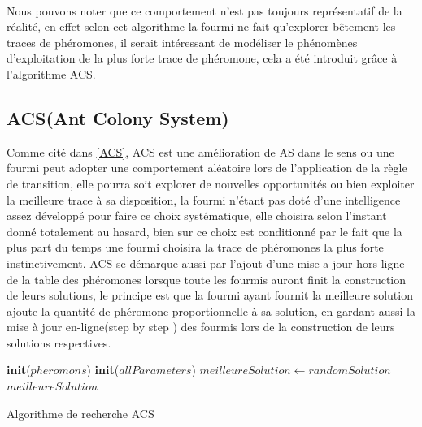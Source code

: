 	\paragraph{}
	Nous pouvons noter que ce comportement n'est pas toujours représentatif de la réalité, en effet selon cet algorithme la fourmi ne fait qu'explorer bêtement les traces de phéromones, il serait intéressant de modéliser le phénomènes d'exploitation de la plus forte trace de phéromone, cela a été introduit grâce à l'algorithme ACS. 
	\newpage
	\subsection{ACS(Ant Colony System)}
	Comme cité dans \ref{ACS}, ACS est une amélioration de AS dans le sens ou une fourmi peut adopter une comportement aléatoire lors de l'application de la règle de transition, elle pourra soit explorer de nouvelles opportunités ou bien exploiter la meilleure trace à sa disposition, la fourmi n'étant pas doté d'une intelligence assez développé pour faire ce choix systématique, elle choisira selon l'instant donné totalement au hasard, bien sur ce choix est conditionné par le fait que la plus part du temps une fourmi choisira la trace de phéromones la plus forte instinctivement. ACS se démarque aussi par l'ajout d'une mise a jour hors-ligne de la table des phéromones lorsque toute les fourmis auront finit la construction de leurs solutions, le principe est que la fourmi ayant fournit la meilleure solution ajoute la quantité de phéromone proportionnelle à sa solution, en gardant aussi la mise à jour en-ligne(step by step ) des fourmis lors  de la construction de leurs solutions respectives.
	
	
	\begin{algorithm}[H]
		\SetAlgoLined
		\textbf{init}($pheromons$)\;
		\textbf{init}($allParameters$)\;
		$meilleureSolution \gets randomSolution$\;
		\Return $meilleureSolution$\;
		\caption{Algorithme de recherche ACS}
	\end{algorithm}
	
